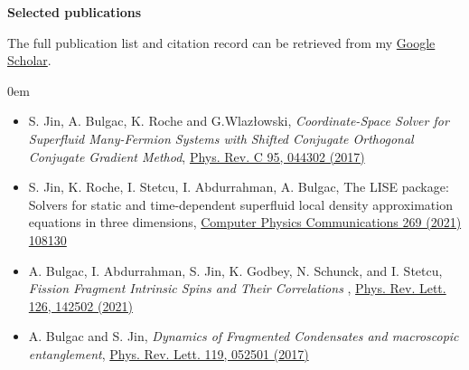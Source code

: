 \documentclass[letterpaper,12pt]{article}
\newcommand{\resheading}[1]{{\large \colorbox{mygrey}{\begin{minipage}{\textwidth}{\textbf{#1 \vphantom{p\^{E}}}}\end{minipage}}}}
\begin{document}
\resheading{Selected publications}

\vspace{0.4cm}
The full publication list and citation record can be retrieved from my \href{https://scholar.google.com/citations?user=Xw-ftGwAAAAJ&hl=en}{Google Scholar}.
\vspace{0.2cm}

\itemsep0em

\footnotesize

\begin{itemize}
\item
S. Jin, A. Bulgac, K. Roche and G.Wlaz\l{}owski, \textit{Coordinate-Space Solver for Superfluid Many-Fermion Systems with Shifted Conjugate Orthogonal Conjugate Gradient Method}, \href{https://journals.aps.org/prc/abstract/10.1103/PhysRevC.95.044302}{Phys. Rev. C 95, 044302 (2017)}

\item
S. Jin, K. Roche, I. Stetcu, I. Abdurrahman, A. Bulgac, The LISE package: Solvers for static and time-dependent superfluid local density approximation equations in three dimensions, \href{https://www.sciencedirect.com/science/article/pii/S0010465521002423}{Computer Physics Communications 269 (2021) 108130}
\item 
A. Bulgac, I. Abdurrahman, S. Jin, K. Godbey, N. Schunck, and I. Stetcu, \textit{Fission Fragment Intrinsic Spins and Their Correlations
}, \href{https://journals.aps.org/prl/abstract/10.1103/PhysRevLett.126.142502}{Phys. Rev. Lett. 126, 142502 (2021)}


\item 
A. Bulgac and S. Jin, \textit{Dynamics of Fragmented Condensates and macroscopic entanglement},  \href{https://journals.aps.org/prl/abstract/10.1103/PhysRevLett.119.052501}{Phys. Rev. Lett. 119, 052501 (2017)}

\end{itemize}





     
\end{document}
